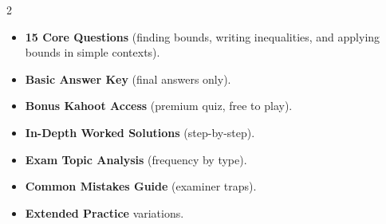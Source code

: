 \documentclass[11pt,a4paper]{article}
\newcommand{\FullReleaseDate}{April 30, 2026}
\begin{document}
\vspace{8pt}

\begin{multicols}{2}
  \begin{tcolorbox}[card, title=\sffamily\bfseries\textcolor{white}{\faHandPointDown\ TODAY (Simplified Version)}, colbacktitle=mainblue, boxed title style={sharp corners, boxrule=0pt}]
    \begin{itemize}[leftmargin=1.2em, itemsep=2pt]
      \item \small \textbf{15 Core Questions} (finding bounds, writing inequalities, and applying bounds in simple contexts).
      \item \small \textbf{Basic Answer Key} (final answers only).
      \item \small \textbf{Bonus Kahoot Access} (premium quiz, free to play).
    \end{itemize}
  \end{tcolorbox}

  \columnbreak

  \begin{tcolorbox}[card, title=\sffamily\bfseries\textcolor{white}{\faRocket\ ON \FullReleaseDate\ (Full Upgrade)}, colbacktitle=mainblue, boxed title style={sharp corners, boxrule=0pt}]
    \begin{itemize}[leftmargin=1.2em, itemsep=2pt]
      \item \small \textbf{In-Depth Worked Solutions} (step-by-step).
      \item \small \textbf{Exam Topic Analysis} (frequency by type).
      \item \small \textbf{Common Mistakes Guide} (examiner traps).
      \item \small \textbf{Extended Practice} variations.
    \end{itemize}
  \end{tcolorbox}
\end{multicols}
\end{document}
